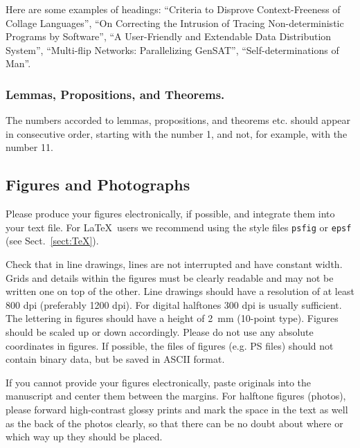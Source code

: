 \documentclass[a4paper]{llncs}
\begin{document}
Here are
some examples of headings: ``Criteria to Disprove Context-Freeness of
Collage Languages'', ``On Correcting the Intrusion of Tracing
Non-deterministic Programs by Software'', ``A User-Friendly and
Extendable Data Distribution System'', ``Multi-flip Networks:
Parallelizing GenSAT'', ``Self-determinations of Man''.

\subsubsection{Lemmas, Propositions, and Theorems.}

The numbers accorded to lemmas, propositions, and theorems etc. should
appear in consecutive order, starting with the number 1, and not, for
example, with the number 11.

\subsection{Figures and Photographs}
\label{sect:figures}

Please produce your figures electronically, if possible,
and integrate them into your text file. For \LaTeX\ users
we recommend using the style files \verb+psfig+ or \verb+epsf+
(see Sect.~\ref{sect:TeX}).

Check that in line drawings, lines are not
interrupted and have constant width. Grids and details within the
figures must be clearly readable and may not be written one on top of
the other. Line drawings should have a resolution of at least 800 dpi
(preferably 1200 dpi).
For digital halftones 300 dpi is usually sufficient.
The lettering in figures should have a height of 2~mm (10-point type).
Figures should be scaled up or down accordingly.
Please do not use any absolute coordinates in figures.
If possible, the files of figures (e.g. PS files) should not contain
binary data, but be saved in ASCII format.

If you cannot provide your figures electronically,
paste originals into the manuscript and center them between the
margins. For halftone figures (photos), please forward high-contrast
glossy prints and mark the space in the text as well as the back of the
photos clearly, so that there can be no doubt about where or which
way up they should be placed.
\end{document}
